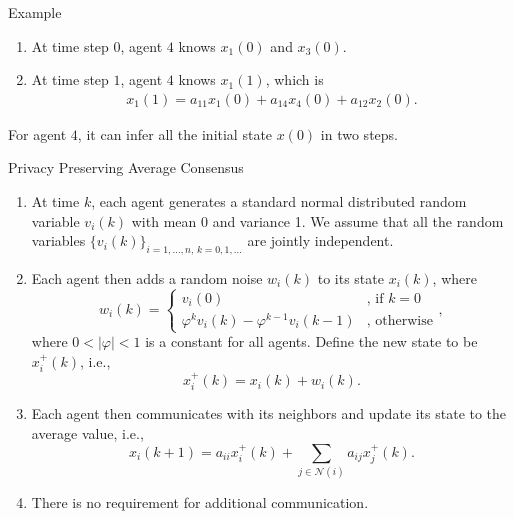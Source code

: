 \documentclass[10pt]{beamer}
\begin{document}
\begin{frame}{Example}
  \begin{center}
  \end{center}
  \begin{enumerate}
  \item At time step $0$, agent $4$ knows $x_1(0)$ and $x_3(0)$.
  \item At time step $1$, agent $4$ knows $x_1(1)$, which is
    \begin{align*}
      x_1(1) = a_{11}x_1(0)+a_{14}x_4(0)+a_{12}x_2(0).    
    \end{align*}
  \end{enumerate}

  For agent $4$, it can infer all the initial state $x(0)$ in two steps.

\end{frame}


\begin{frame}{Privacy Preserving Average Consensus}
  \begin{enumerate}
  \item At time $k$, each agent generates a standard normal distributed random variable $v_i(k)$ with mean $0$ and variance 1. We assume that all the random variables $\{v_i(k)\}_{i=1,\dots,n,\,k=0,1,\dots}$ are jointly independent.
  \item Each agent then adds a random noise $w_i(k)$ to its state $x_i(k)$, where
    \begin{displaymath}
      w_i(k) = \begin{cases}
        v_i(0)&\text{, if }k = 0\\
        \varphi^kv_i(k)-\varphi^{k-1}v_i(k-1)&\text{, otherwise}
      \end{cases},
      \label{eq:addednoise}
    \end{displaymath}
    where $0<|\varphi|<1$ is a constant for all agents. Define the new state to be $x_{i}^+(k)$, i.e.,
    \begin{displaymath}
      x_{i}^+(k) = x_i(k) + w_i(k).  
      \label{eq:noisestep}
    \end{displaymath}
  \item Each agent then communicates with its neighbors and update its state to the average value, i.e.,
    \begin{displaymath}
      x_i(k+1) = a_{ii}x_i^+(k)+\sum_{j\in \mathcal N(i)}a_{ij}x_{j}^+(k).
      \label{eq:consensusstep}
    \end{displaymath}
  \item There is no requirement for additional communication.
  \end{enumerate}
\end{frame}
\end{document}
